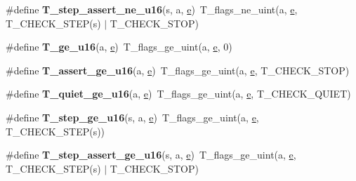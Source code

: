 \begin{DoxyCompactItemize}
\#define {\bfseries T\+\_\+step\+\_\+assert\+\_\+ne\+\_\+u16}(s,  a,  \mbox{\hyperlink{sun4u_2tte_8h_a8b0b9ed08e0e18920ec2682f48228c27}{e}})~T\+\_\+flags\+\_\+ne\+\_\+uint(a, \mbox{\hyperlink{sun4u_2tte_8h_a8b0b9ed08e0e18920ec2682f48228c27}{e}}, T\+\_\+\+C\+H\+E\+C\+K\+\_\+\+S\+T\+EP(s) $\vert$ T\+\_\+\+C\+H\+E\+C\+K\+\_\+\+S\+T\+OP)
\item 
\mbox{\label{group__RTEMSTestFrameworkChecksUInt16_ga78f6d05cef5fa1e05eeeb5612954cf7b}} 
\#define {\bfseries T\+\_\+ge\+\_\+u16}(a,  \mbox{\hyperlink{sun4u_2tte_8h_a8b0b9ed08e0e18920ec2682f48228c27}{e}})~T\+\_\+flags\+\_\+ge\+\_\+uint(a, \mbox{\hyperlink{sun4u_2tte_8h_a8b0b9ed08e0e18920ec2682f48228c27}{e}}, 0)
\item 
\mbox{\label{group__RTEMSTestFrameworkChecksUInt16_gae3760e30256ecaaad86b9487d2e79ad2}} 
\#define {\bfseries T\+\_\+assert\+\_\+ge\+\_\+u16}(a,  \mbox{\hyperlink{sun4u_2tte_8h_a8b0b9ed08e0e18920ec2682f48228c27}{e}})~T\+\_\+flags\+\_\+ge\+\_\+uint(a, \mbox{\hyperlink{sun4u_2tte_8h_a8b0b9ed08e0e18920ec2682f48228c27}{e}}, T\+\_\+\+C\+H\+E\+C\+K\+\_\+\+S\+T\+OP)
\item 
\mbox{\label{group__RTEMSTestFrameworkChecksUInt16_ga467985b7ea521b7162dfe3f151dcd2c4}} 
\#define {\bfseries T\+\_\+quiet\+\_\+ge\+\_\+u16}(a,  \mbox{\hyperlink{sun4u_2tte_8h_a8b0b9ed08e0e18920ec2682f48228c27}{e}})~T\+\_\+flags\+\_\+ge\+\_\+uint(a, \mbox{\hyperlink{sun4u_2tte_8h_a8b0b9ed08e0e18920ec2682f48228c27}{e}}, T\+\_\+\+C\+H\+E\+C\+K\+\_\+\+Q\+U\+I\+ET)
\item 
\mbox{\label{group__RTEMSTestFrameworkChecksUInt16_ga262e315340d9be91a50ac8563768948e}} 
\#define {\bfseries T\+\_\+step\+\_\+ge\+\_\+u16}(s,  a,  \mbox{\hyperlink{sun4u_2tte_8h_a8b0b9ed08e0e18920ec2682f48228c27}{e}})~T\+\_\+flags\+\_\+ge\+\_\+uint(a, \mbox{\hyperlink{sun4u_2tte_8h_a8b0b9ed08e0e18920ec2682f48228c27}{e}}, T\+\_\+\+C\+H\+E\+C\+K\+\_\+\+S\+T\+EP(s))
\item 
\mbox{\label{group__RTEMSTestFrameworkChecksUInt16_gace5b7eade33e2b68db16379a54fcfc61}} 
\#define {\bfseries T\+\_\+step\+\_\+assert\+\_\+ge\+\_\+u16}(s,  a,  \mbox{\hyperlink{sun4u_2tte_8h_a8b0b9ed08e0e18920ec2682f48228c27}{e}})~T\+\_\+flags\+\_\+ge\+\_\+uint(a, \mbox{\hyperlink{sun4u_2tte_8h_a8b0b9ed08e0e18920ec2682f48228c27}{e}}, T\+\_\+\+C\+H\+E\+C\+K\+\_\+\+S\+T\+EP(s) $\vert$ T\+\_\+\+C\+H\+E\+C\+K\+\_\+\+S\+T\+OP)

\end{DoxyCompactItemize}
